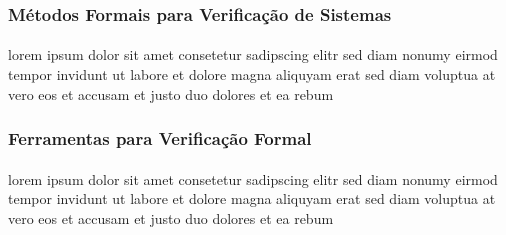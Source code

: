\subsubsection{Métodos Formais para Verificação de Sistemas}
\paragraph{}
lorem ipsum dolor sit amet consetetur sadipscing elitr sed diam nonumy
eirmod tempor invidunt ut labore et dolore magna aliquyam erat sed diam
voluptua at vero eos et accusam et justo duo dolores et ea rebum

\subsubsection{Ferramentas para Verificação Formal}
\paragraph{}
lorem ipsum dolor sit amet consetetur sadipscing elitr sed diam nonumy
eirmod tempor invidunt ut labore et dolore magna aliquyam erat sed diam
voluptua at vero eos et accusam et justo duo dolores et ea rebum
